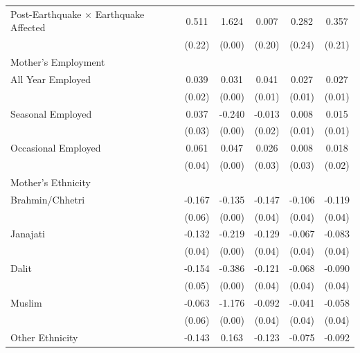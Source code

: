 \begin{longtable}{l*{5}{c}}
Post-Earthquake × Earthquake Affected & 0.511\sym{**} & 1.624\sym{***} & 0.007 & 0.282 & 0.357\sym{*} \\
                    & (0.22) & (0.00) & (0.20) & (0.24) & (0.21) \\
\multicolumn{6}{l}{Mother's Employment} \\
\hspace{1em}All Year Employed & 0.039\sym{**} & 0.031\sym{***} & 0.041\sym{***} & 0.027\sym{*} & 0.027\sym{*} \\
                    & (0.02) & (0.00) & (0.01) & (0.01) & (0.01) \\
\hspace{1em}Seasonal Employed & 0.037 & -0.240\sym{***} & -0.013 & 0.008 & 0.015 \\
                    & (0.03) & (0.00) & (0.02) & (0.01) & (0.01) \\
\hspace{1em}Occasional Employed & 0.061\sym{*} & 0.047\sym{***} & 0.026 & 0.008 & 0.018 \\
                    & (0.04) & (0.00) & (0.03) & (0.03) & (0.02) \\
\multicolumn{6}{l}{Mother's Ethnicity} \\
\hspace{1em}Brahmin/Chhetri & -0.167\sym{***} & -0.135\sym{***} & -0.147\sym{***} & -0.106\sym{**} & -0.119\sym{***} \\
                    & (0.06) & (0.00) & (0.04) & (0.04) & (0.04) \\
\hspace{1em}Janajati & -0.132\sym{***} & -0.219\sym{***} & -0.129\sym{***} & -0.067\sym{*} & -0.083\sym{**} \\
                    & (0.04) & (0.00) & (0.04) & (0.04) & (0.04) \\
\hspace{1em}Dalit & -0.154\sym{***} & -0.386\sym{***} & -0.121\sym{***} & -0.068\sym{*} & -0.090\sym{**} \\
                    & (0.05) & (0.00) & (0.04) & (0.04) & (0.04) \\
\hspace{1em}Muslim & -0.063 & -1.176\sym{***} & -0.092\sym{**} & -0.041 & -0.058 \\
                    & (0.06) & (0.00) & (0.04) & (0.04) & (0.04) \\
\hspace{1em}Other Ethnicity & -0.143\sym{***} & 0.163\sym{***} & -0.123\sym{***} & -0.075\sym{**} & -0.092\sym{***} \\

\end{longtable}
